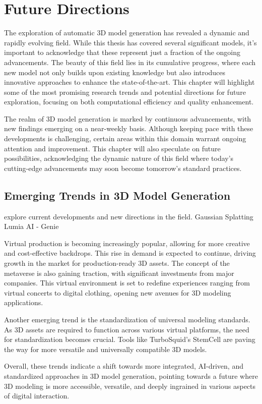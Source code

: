\chapter{Future Directions}
\label{ch:future}
The exploration of automatic 3D model generation has revealed a dynamic and rapidly evolving field. While this thesis has covered several significant models, it's important to acknowledge that these represent just a fraction of the ongoing advancements. The beauty of this field lies in its cumulative progress, where each new model not only builds upon existing knowledge but also introduces innovative approaches to enhance the state-of-the-art. This chapter will highlight some of the most promising research trends and potential directions for future exploration, focusing on both computational efficiency and quality enhancement.

The realm of 3D model generation is marked by continuous advancements, with new findings emerging on a near-weekly basis. Although keeping pace with these developments is challenging, certain areas within this domain warrant ongoing attention and improvement. This chapter will also speculate on future possibilities, acknowledging the dynamic nature of this field where today's cutting-edge advancements may soon become tomorrow's standard practices.


\section{Emerging Trends in 3D Model Generation}
explore current developments and new directions in the field.
Gaussian Splatting
Lumia AI - Genie


Virtual production is becoming increasingly popular, allowing for more creative and cost-effective backdrops. This rise in demand is expected to continue, driving growth in the market for production-ready 3D assets. The concept of the metaverse is also gaining traction, with significant investments from major companies. This virtual environment is set to redefine experiences ranging from virtual concerts to digital clothing, opening new avenues for 3D modeling applications.

Another emerging trend is the standardization of universal modeling standards. As 3D assets are required to function across various virtual platforms, the need for standardization becomes crucial. Tools like TurboSquid's StemCell are paving the way for more versatile and universally compatible 3D models.

Overall, these trends indicate a shift towards more integrated, AI-driven, and standardized approaches in 3D model generation, pointing towards a future where 3D modeling is more accessible, versatile, and deeply ingrained in various aspects of digital interaction.



